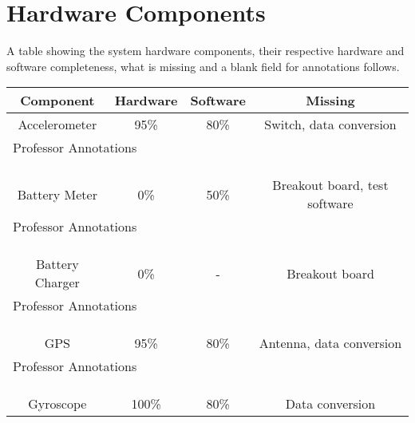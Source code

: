 \section{Hardware Components}
A table showing the system hardware components, their respective hardware and software completeness, what is missing and a blank field for annotations follows.
\begin{center}

    \begin{tabular}{|c|c|c|c|}
    \hline
    \rowcolor{Gray}
    Component & Hardware & Software & Missing \\
    \hline \hline   
        Accelerometer & 95\% & 80\% & Switch, data conversion \\ \hline
         \multicolumn{4}{|l|}{Professor Annotations} \\ 
         \multicolumn{4}{|l|}{} \\
         \multicolumn{4}{|l|}{} \\                   
         \multicolumn{4}{|l|}{} \\ \hline \hline
        Battery Meter & 0\% & 50\%  & Breakout board, test software \\ \hline
         \multicolumn{4}{|l|}{Professor Annotations} \\ 
         \multicolumn{4}{|l|}{} \\
         \multicolumn{4}{|l|}{} \\                   
         \multicolumn{4}{|l|}{} \\ \hline \hline      
        Battery Charger & 0\% & -  & Breakout board \\ \hline
         \multicolumn{4}{|l|}{Professor Annotations} \\ 
         \multicolumn{4}{|l|}{} \\
         \multicolumn{4}{|l|}{} \\                   
         \multicolumn{4}{|l|}{} \\ \hline \hline       
        GPS   & 95\% & 80\%   & Antenna, data conversion \\ \hline
         \multicolumn{4}{|l|}{Professor Annotations} \\ 
         \multicolumn{4}{|l|}{} \\
         \multicolumn{4}{|l|}{} \\                   
         \multicolumn{4}{|l|}{} \\ \hline \hline       
        Gyroscope & 100\%   & 80\% & Data conversion \\ \hline

\end{tabular}
\end{center}
